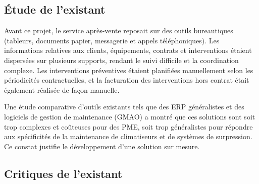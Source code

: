 \subsection{Étude de l'existant}

Avant ce projet, le service après-vente reposait sur des outils bureautiques (tableurs, documents
papier, messagerie et appels téléphoniques). Les informations relatives aux clients, équipements,
contrats et interventions étaient dispersées sur plusieurs supports, rendant le suivi difficile et
la coordination complexe. Les interventions préventives étaient planifiées manuellement selon les
périodicités contractuelles, et la facturation des interventions hors contrat était également
réalisée de façon manuelle.

Une étude comparative d'outils existants tels que des ERP généralistes et des logiciels de gestion
de maintenance (GMAO) a montré que ces solutions sont soit trop complexes et coûteuses pour des PME,
soit trop généralistes pour répondre aux spécificités de la maintenance de climatiseurs et de
systèmes de surpression. Ce constat justifie le développement d'une solution sur mesure.

\subsection{Critiques de l'existant}


